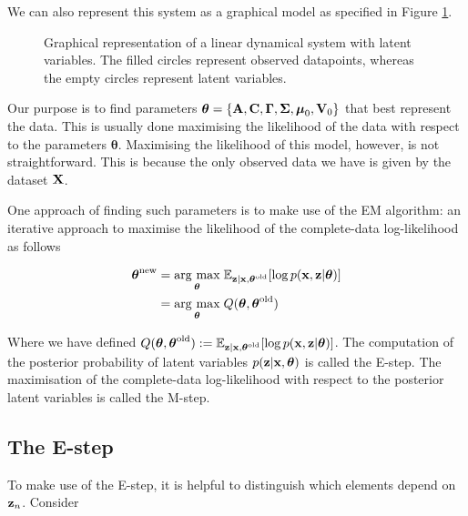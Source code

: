 \documentclass[11pt]{article}
\numberwithin{equation}{section}
\newcommand{\argmax}[1]{\underset{#1}{\operatorname{arg}\,\operatorname{max}}\;}
\newcommand{\x}{{\bf x}}
\newcommand{\z}{{\bf z}}
\begin{document}
We can also represent this system as a graphical model as specified in Figure \ref{fig:lds-gm}.

\begin{figure}
	\centering
	
	\caption{Graphical representation of a linear dynamical system with latent variables. The filled circles represent observed datapoints, whereas the empty circles represent latent variables.}
	\label{fig:lds-gm}
\end{figure}


Our purpose is to find parameters $\boldsymbol\theta = \{{\bf A}, {\bf C}, \boldsymbol\Gamma, \boldsymbol\Sigma, \boldsymbol\mu_0, {\bf V}_0\}$ that best represent the data. This is usually done maximising the likelihood of the data with respect to the parameters $\boldsymbol{\theta}$. Maximising the likelihood of this model, however, is not straightforward. This is because the only observed data we have is given by the dataset $\bf X$. %


One approach of finding such parameters is to make use of the EM algorithm: an iterative approach to maximise the likelihood of the complete-data log-likelihood as follows

\begin{align}
	\boldsymbol{\theta}^\text{new} &= \argmax{\boldsymbol{\theta}} \mathbb{E}_{\z\vert \x, \boldsymbol{\theta}^\text{old}}[\log p(\x, \z\vert \boldsymbol\theta)]\\
	&= \argmax{\boldsymbol{\theta}} Q(\boldsymbol\theta, \boldsymbol\theta^\text{old})
\end{align}

Where we have defined $Q(\boldsymbol\theta, \boldsymbol\theta^\text{old}) := \mathbb{E}_{\z\vert \x, \boldsymbol{\theta}^\text{old}}[\log p(\x, \z\vert \boldsymbol\theta)]$. The computation of the posterior probability of latent variables $p(\z\vert \x, \boldsymbol\theta)$ is called the E-step. The maximisation of the complete-data log-likelihood with respect to the posterior latent variables is called the M-step.


\subsection{The E-step}
To make use of the E-step, it is helpful to distinguish which elements depend on $\z_n$. Consider
\end{document}
